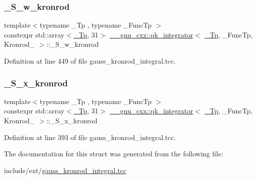 \subsubsection{\texorpdfstring{\+\_\+\+S\+\_\+w\+\_\+kronrod}{\_S\_w\_kronrod}}
{\footnotesize\ttfamily template$<$typename \+\_\+\+Tp , typename \+\_\+\+Func\+Tp $>$ \\
constexpr std\+::array$<$\hyperlink{namespace____gnu__cxx_a3b19a9c800ca194374ef9172290f7d79}{\+\_\+\+Tp}, 31$>$ \hyperlink{class____gnu__cxx_1_1qk__integrator}{\+\_\+\+\_\+gnu\+\_\+cxx\+::qk\+\_\+integrator}$<$ \hyperlink{namespace____gnu__cxx_a3b19a9c800ca194374ef9172290f7d79}{\+\_\+\+Tp}, \+\_\+\+Func\+Tp, Kronrod\+\_ $>$\+::\+\_\+\+S\+\_\+w\+\_\+kronrod\hspace{0.3cm}{\ttfamily [static]}}



Definition at line 449 of file gauss\+\_\+kronrod\+\_\+integral.\+tcc.

\mbox{\label{struct____gnu__cxx_1_1qk__integrator_3_01__Tp_00_01__FuncTp_00_01Kronrod__61_01_4_a8ecea92a219b905f30f34fe0c8ab0063}} 
\subsubsection{\texorpdfstring{\+\_\+\+S\+\_\+x\+\_\+kronrod}{\_S\_x\_kronrod}}
{\footnotesize\ttfamily template$<$typename \+\_\+\+Tp , typename \+\_\+\+Func\+Tp $>$ \\
constexpr std\+::array$<$\hyperlink{namespace____gnu__cxx_a3b19a9c800ca194374ef9172290f7d79}{\+\_\+\+Tp}, 31$>$ \hyperlink{class____gnu__cxx_1_1qk__integrator}{\+\_\+\+\_\+gnu\+\_\+cxx\+::qk\+\_\+integrator}$<$ \hyperlink{namespace____gnu__cxx_a3b19a9c800ca194374ef9172290f7d79}{\+\_\+\+Tp}, \+\_\+\+Func\+Tp, Kronrod\+\_ $>$\+::\+\_\+\+S\+\_\+x\+\_\+kronrod\hspace{0.3cm}{\ttfamily [static]}}



Definition at line 393 of file gauss\+\_\+kronrod\+\_\+integral.\+tcc.



The documentation for this struct was generated from the following file\+:\begin{DoxyCompactItemize}
\item 
include/ext/\hyperlink{gauss__kronrod__integral_8tcc}{gauss\+\_\+kronrod\+\_\+integral.\+tcc}\end{DoxyCompactItemize}
